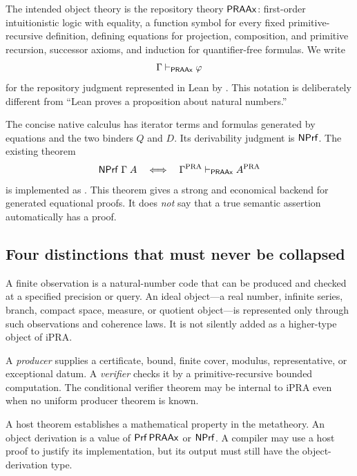 The intended object theory is the repository theory \(\mathsf{PRAAx}\): first-order intuitionistic logic with equality, a function symbol for every fixed primitive-recursive definition, defining equations for projection, composition, and primitive recursion, successor axioms, and induction for quantifier-free formulas.  We write
\[
   \Gamma\vdash_{\mathsf{PRAAx}}\varphi
\]
for the repository judgment represented in Lean by .  This notation is deliberately different from ``Lean proves a proposition about natural numbers.''

The concise native calculus has iterator terms and formulas generated by equations and the two binders \(Q\) and \(D\).  Its derivability judgment is \(\mathsf{NPrf}\).  The existing theorem
\[
  \mathsf{NPrf}\;\Gamma\;A
  \quad\Longleftrightarrow\quad
  \Gamma^{\mathrm{PRA}}\vdash_{\mathsf{PRAAx}} A^{\mathrm{PRA}}
\]
is implemented as .  This theorem gives a strong and economical backend for generated equational proofs.  It does \emph{not} say that a true semantic assertion automatically has a proof.

\subsection{Four distinctions that must never be collapsed}

\begin{definition}
A finite observation is a natural-number code that can be produced and checked at a specified precision or query.  An ideal object---a real number, infinite series, branch, compact space, measure, or quotient object---is represented only through such observations and coherence laws.  It is not silently added as a higher-type object of iPRA.
\end{definition}

\begin{definition}
A \emph{producer} supplies a certificate, bound, finite cover, modulus, representative, or exceptional datum.  A \emph{verifier} checks it by a primitive-recursive bounded computation.  The conditional verifier theorem may be internal to iPRA even when no uniform producer theorem is known.
\end{definition}

\begin{definition}
A host theorem establishes a mathematical property in the metatheory.  An object derivation is a value of \(\mathsf{Prf}\,\mathsf{PRAAx}\) or \(\mathsf{NPrf}\).  A compiler may use a host proof to justify its implementation, but its output must still have the object-derivation type.
\end{definition}

